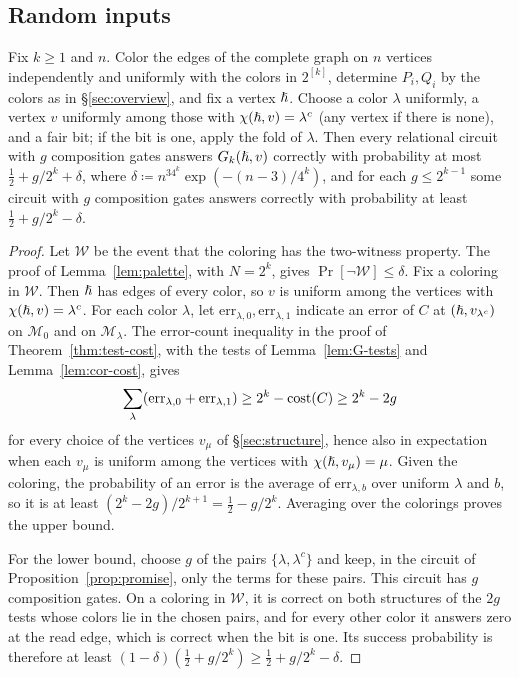 \subsection{Random inputs}\label{sec:random-inputs}
\begin{corollary}\label{cor:random-inputs}
Fix $k\ge1$ and $n$. Color the edges of the complete graph on $n$
vertices independently and uniformly with the colors in $2^{[k]}$,
determine $P_i,Q_i$ by the colors as in \S\ref{sec:overview}, and
fix a vertex $\hslash$. Choose a color $\lambda$ uniformly, a vertex $v$
uniformly among those with $\chi(\hslash,v)=\lambda^c$ (any vertex if there
is none), and a fair bit; if the bit is one, apply the fold of
$\lambda$. Then every relational circuit with $g$ composition gates
answers $G_k(\hslash,v)$ correctly with probability at most
$\frac12+g/2^k+\delta$,
where $\delta\coloneqq n^34^k\exp(-(n-3)/4^k)$, and for each
$g\le2^{k-1}$ some circuit with $g$ composition gates answers correctly
with probability at least $\frac12+g/2^k-\delta$.
\end{corollary}
\begin{proof}
Let $\mathcal W$ be the event that the coloring has the two-witness
property. The proof of Lemma~\ref{lem:palette}, with $N=2^k$, gives
$\Pr[\lnot\mathcal W]\le\delta$. Fix a coloring in $\mathcal W$. Then
$\hslash$ has edges of every color, so $v$ is uniform among the vertices
with $\chi(\hslash,v)=\lambda^c$. For each color $\lambda$, let
$\mathrm{err}_{\lambda,0},\mathrm{err}_{\lambda,1}$ indicate an error of
$C$ at $(\hslash,v_{\lambda^c})$ on $\mathcal M_0$ and on $\mathcal M_\lambda$.
The error-count inequality in the proof of Theorem~\ref{thm:test-cost},
with the tests of Lemma~\ref{lem:G-tests} and Lemma~\ref{lem:cor-cost},
gives
\[
 \sum_\lambda(\mathrm{err}_{\lambda,0}+\mathrm{err}_{\lambda,1})
 \ge2^k-\operatorname{cost}(C)\ge2^k-2g
\]
for every choice of the vertices $v_\mu$ of \S\ref{sec:structure}, hence
also in expectation when each $v_\mu$ is uniform among the vertices with
$\chi(\hslash,v_\mu)=\mu$. Given the coloring, the probability of
an error is the average of $\mathrm{err}_{\lambda,b}$ over uniform
$\lambda$ and $b$, so it is
at least $(2^k-2g)/2^{k+1}=\frac12-g/2^k$. Averaging over the colorings
proves the upper bound.

For the lower bound, choose $g$ of the pairs $\{\lambda,\lambda^c\}$ and keep, in the
circuit of Proposition~\ref{prop:promise}, only the terms for these pairs.
This circuit has $g$ composition gates. On a coloring in $\mathcal W$, it
is correct on both structures of the $2g$ tests whose colors lie in the
chosen pairs, and for every other color it answers zero at the read
edge, which is correct when the bit is one. Its success probability is
therefore at least $(1-\delta)(\frac12+g/2^k)\ge\frac12+g/2^k-\delta$.
\end{proof}

